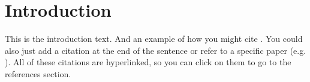 \section*{Introduction}

This is the introduction text. And an example of how you might cite \cite{Patterson2012}. You could also just add a citation at the end of the sentence \citep{Patterson2012} or refer to a specific paper (e.g. \citealt{Patterson2012}). All of these citations are hyperlinked, so you can click on them to go to the references section.